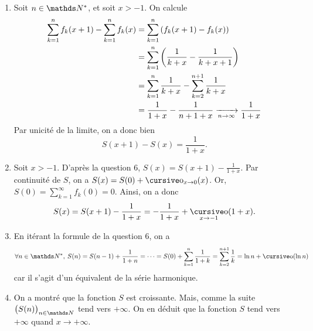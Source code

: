\documentclass[a4paper,9pt]{article}
\begin{document}
\begin{enumerate}
		\item Soit $n \in \N^*$, et soit $x > -1$. On calcule
			\begin{align*}
				\sum_{k=1}^n f_k(x + 1) - \sum_{k=1}^n f_k(x)
				&= \sum_{k=1}^n \left( f_k(x + 1) - f_k(x) \right) \\
				&= \sum_{k=1}^n \left( \frac{1}{k+x} - \frac{1}{k+x+1} \right) \\
				&= \sum_{k=1}^n \frac{1}{k+x} - \sum_{k=2}^{n+1} \frac{1}{k+x} \\
				&= \frac{1}{1+x} - \frac{1}{n+1+x}\xrightarrow[n\to \infty]{} \frac{1}{1+x} \\
			\end{align*}
			Par unicité de la limite, on a donc bien \[
				S(x+1) - S(x) = \frac{1}{1+x}
			.\]
		\item Soit $x > -1$. D'après la question 6, $S(x) = S(x+1) - \frac{1}{1+x}$. Par continuité de $S$, on a $S(x) = S(0) + \po_{x\to 0}(x)$. Or, $S(0) = \sum_{k=1}^\infty f_k(0) = 0$. Ainsi, on a donc \[
				S(x) = S(x+1) - \frac{1}{1+x} = -\frac{1}{1+x} + \po_{x\to -1}(1+x)
			.\]
		\item En itérant la formule de la question 6, on a \[
				\forall n \in \N^*,\:S(n) = S(n-1) + \frac{1}{1+n} = \cdots = S(0) + \sum_{k=1}^n \frac{1}{1+k} = \sum_{k=2}^{n+1} \frac{1}{k} = \ln n + \po(\ln n)
			\] car il s'agit d'un équivalent de la série harmonique.
		\item On a montré que la fonction $S$\/ est croissante. Mais, comme la suite $\big(S(n)\big)_{n \in \N}$\/ tend vers $+\infty$. On en déduit que la fonction $S$\/ tend vers $+\infty$\/ quand $x \to +\infty$.
	\end{enumerate}
\end{document}

